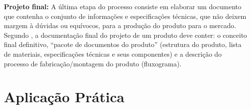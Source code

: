 \textbf{Projeto final:} A última etapa do processo consiste em elaborar um documento que contenha o conjunto de informações e especificações técnicas, que não deixem margem à dúvidas ou equívocos, para a produção do produto para o mercado. Segundo \cite{slack2006administracao}, a documentação final do projeto de um produto deve conter: o conceito final definitivo, ``pacote de documentos do produto'' (estrutura do produto, lista de materiais, especificações técnicas e seus componentes) e a descrição do processo de fabricação/montagem do produto (fluxograma).


\section{Aplicação Prática}
\label{sec:projeto_do_produto_aplicacao}